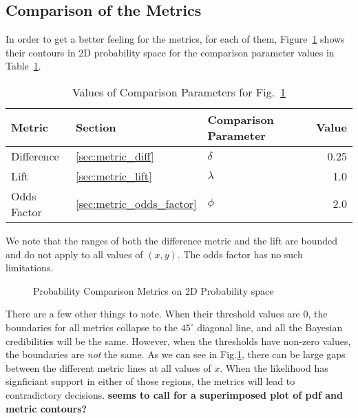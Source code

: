 \documentclass[letterpaper,12pt]{article}
\begin{document}
\subsection{Comparison of the Metrics}
\label{metric_comparison}
In order to get a better feeling for the metrics, for each of them,
Figure~\ref{fig:probmetrics} shows their contours in 2D probability space for
the comparison parameter values in Table~\ref{table:param_values}.
\begin{table}
\centering
\begin{tabular}{|l|l|l|r|} \hline \hline
{\bf Metric} & {\bf Section} & {\bf Comparison Parameter} & {\bf Value}  \\ \hline \hline
Difference & \ref{sec:metric_diff} & \(\delta\) & 0.25 \\ \hline 
%
Lift & \ref{sec:metric_lift}& \(\lambda\) & 1.0\\ \hline 
%
Odds Factor & \ref{sec:metric_odds_factor} & \(\phi \)
& 2.0\\ \hline
\hline
\end{tabular}
\caption{Values of Comparison Parameters for Fig.~\ref{fig:probmetrics}}
\label{table:param_values}
\end{table}
We note that the ranges of both the difference metric and the lift are 
bounded and do not apply to all values of \((x,y)\). The odds factor has no
such limitations.

\begin{figure}[ht!]
\centering
\caption{Probability Comparison Metrics on 2D Probability
  space \label{fig:probmetrics}}
\end{figure}

There are a few other things to note. When their threshold values are
0, the boundaries for all metrics collapse to the \(45^\circ\)
diagonal line, and all the Bayesian credibilities will be the same.
However, when the thresholds have non-zero values, the boundaries are
{\em not} the same. As we can see in Fig.\ref{fig:probmetrics}, there
can be large gaps between the different metric lines at all values of
\(x\). When the likelihood has signficiant support in either of those
regions, the metrics will lead to contradictory decisions. {\bf seems
  to call for a superimposed plot of pdf and metric contours?}
\end{document}
